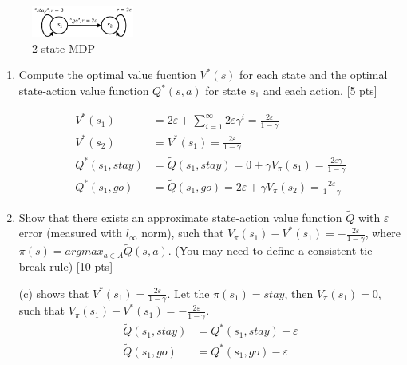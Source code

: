 \documentclass[11pt]{article}
\let\epsilon\varepsilon
\begin{document}
\begin{figure}[h]
  \centering
    \includegraphics[width=0.3\textwidth]{Q3.pdf}
    \caption{2-state MDP}
  	\label{fig:Q3}
\end{figure}
\begin{enumerate}

\item[(c)] Compute the optimal value fucntion $V^*(s)$ for each state and the optimal state-action value function $Q^*(s,a)$ for state $s_1$ and each action. [5 pts]

\begin{tcolorbox}[breakable]
  \begin{equation}
    \begin{aligned}
      V^*(s_1)&=2\epsilon+\sum_{i=1}^{\infty}2\epsilon\gamma^i=\frac{2\epsilon}{1-\gamma}\\
      V^*(s_2)&=V^*(s_1)=\frac{2\epsilon}{1-\gamma}\\
      Q^*(s_1,stay)&=\tilde{Q}(s_1,stay)=0+\gamma V_\pi(s_1)=\frac{2\epsilon\gamma}{1-\gamma}\\
      Q^*(s_1,go)&=\tilde{Q}(s_1,go)=2\epsilon+\gamma V_\pi(s_2)=\frac{2\epsilon}{1-\gamma}
    \end{aligned}
  \end{equation}
\end{tcolorbox}

\item[(d)] Show that there exists an approximate state-action value function $\tilde{Q}$ with $\epsilon$ error (measured with $l_{\infty}$ norm), such that $V_{\pi}(s_1) - V^*(s_1) = - \frac{2\epsilon}{1-\gamma}$, where $\pi(s) = argmax_{a \in A} \tilde{Q}(s,a)$. (You may need to define a consistent tie break rule) [10 pts]

\begin{tcolorbox}[breakable]
  (c) shows that $V^*(s_1)=\frac{2\epsilon}{1-\gamma}$. Let the $\pi(s_1)=stay$, then $V_\pi(s_1)=0$, such that $V_\pi(s_1)-V^*(s_1)=-\frac{2\epsilon}{1-\gamma}$.\\
  
  \begin{equation}
    \begin{aligned}
      \tilde{Q}(s_1,stay)&=Q^*(s_1,stay)+\epsilon\\
      \tilde{Q}(s_1,go)&=Q^*(s_1,go)-\epsilon
    \end{aligned}
  \end{equation}
\end{tcolorbox}

\end{enumerate}
\end{document}
